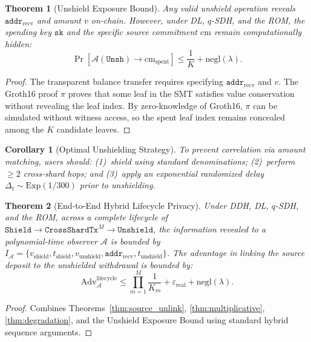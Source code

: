 \documentclass[sigconf,nonacm]{acmart}
\newtheorem{theorem}{Theorem}
\newtheorem{corollary}{Corollary}
\begin{document}
\begin{theorem}[Unshield Exposure Bound]
Any valid unshield operation reveals $\mathtt{addr}_{\text{recv}}$ and amount $v$ on-chain. However, under DL, $q$-SDH, and the ROM, the spending key $\mathtt{sk}$ and the specific source commitment $\text{cm}$ remain computationally hidden:
\begin{equation}
\Pr[\mathcal{A}(\mathtt{Unsh}) \to \text{cm}_{\text{spent}}] \le \frac{1}{K} + \text{negl}(\lambda).
\end{equation}
\end{theorem}

\begin{proof}
The transparent balance transfer requires specifying $\mathtt{addr}_{\text{recv}}$ and $v$. The Groth16 proof $\pi$ proves that some leaf in the SMT satisfies value conservation without revealing the leaf index. By zero-knowledge of Groth16, $\pi$ can be simulated without witness access, so the spent leaf index remains concealed among the $K$ candidate leaves.
\end{proof}

\begin{corollary}[Optimal Unshielding Strategy]
To prevent correlation via amount matching, users should: (1)~shield using standard denominations; (2)~perform $\ge 2$ cross-shard hops; and (3)~apply an exponential randomized delay $\Delta_t \sim \text{Exp}(1/300)$ prior to unshielding.
\end{corollary}

\begin{theorem}[End-to-End Hybrid Lifecycle Privacy]
Under DDH, DL, $q$-SDH, and the ROM, across a complete lifecycle of $\mathtt{Shield} \to \mathtt{CrossShardTx}^M \to \mathtt{Unshield}$, the information revealed to a polynomial-time observer $\mathcal{A}$ is bounded by $I_{\mathcal{A}} = \{ v_{\text{shield}}, t_{\text{shield}}, v_{\text{unshield}}, \mathtt{addr}_{\text{recv}}, t_{\text{unshield}} \}$. The advantage in linking the source deposit to the unshielded withdrawal is bounded by:
\begin{equation}
\text{Adv}^{\text{lifecycle}}_{\mathcal{A}} \le \prod_{m=1}^M \frac{1}{K_m} + \varepsilon_{\text{real}} + \text{negl}(\lambda).
\end{equation}
\end{theorem}

\begin{proof}
Combines Theorems~\ref{thm:source_unlink}, \ref{thm:multiplicative}, \ref{thm:degradation}, and the Unshield Exposure Bound using standard hybrid sequence arguments.
\end{proof}
\end{document}
